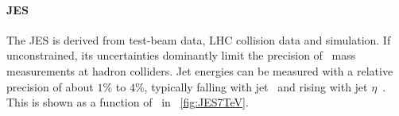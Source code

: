 \paragraph{\gls{JES}}\mbox{}
%
The \gls{JES} is derived from test-beam data, \gls{LHC} collision data and simulation. If unconstrained, its uncertainties dominantly limit the precision of \tquark\ mass measurements at hadron colliders. 
% 
Jet energies can be measured with a relative precision of about $1\%$ to $4\%$, typically falling with jet \pt\ and rising with jet $\eta$~\cite{ATLASCollaboration2015b}. This is shown as a function of \pt\ in \fig~\ref{fig:JES7TeV}. 
%
%
%
